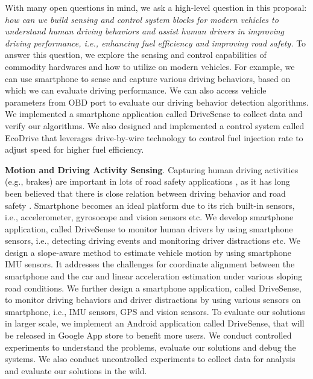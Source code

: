 With many open questions in mind, we ask a high-level question in this proposal: 
\emph{how can we build sensing and control system blocks for modern vehicles to
understand human driving behaviors and assist human drivers in 
improving driving performance, i.e., enhancing fuel efficiency and improving road safety.}
To answer this question, we explore the sensing and control capabilities
of commodity hardwares and how to utilize on modern vehicles. 
For example, we can use smartphone to sense and capture 
various driving behaviors, 
based on which we can evaluate driving performance. 
We can also access vehicle parameters from OBD 
port \cite{obd} to evaluate our driving behavior detection algorithms. 
We implemented a smartphone application called DriveSense to collect
data and verify our algorithms. 
We also designed and implemented a control system called EcoDrive that 
leverages drive-by-wire technology to control fuel injection
rate to adjust speed for higher fuel efficiency. 



\textbf{Motion and Driving Activity Sensing}. 
Capturing human driving activities (e.g., brakes) are important
in lots of road safety applications \cite{uber}, 
as it has long been believed that there is close relation
between driving behavior and road safety \cite{progressive}.
Smartphone becomes an ideal platform due to its rich built-in
sensors, i.e., accelerometer, gyrosocope and vision sensors etc. 
We develop smartphone application, called DriveSense 
to monitor human drivers by using smartphone sensors, 
i.e., detecting driving events and monitoring driver distractions etc. 
We design a slope-aware method to estimate vehicle motion by using
smartphone IMU sensors. 
It addresses the challenges for coordinate alignment between the smartphone 
and the car and linear acceleration estimation under various sloping road conditions.
We further design a smartphone application, called DriveSense, 
to monitor driving behaviors and driver distractions by using various sensors on smartphone, 
i.e., IMU sensors, GPS and vision sensors. 
To evaluate our solutions in larger scale, we implement an Android
application called DriveSense, that will be released in Google
App store to benefit more users. 
We conduct controlled experiments to understand the problems, 
evaluate our solutions and debug the systems. 
We also conduct uncontrolled experiments to collect data
for analysis and evaluate our solutions in the wild. 




